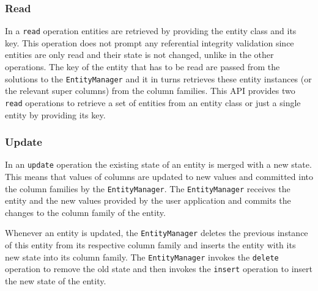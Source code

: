 		
		
		\subsubsection{Read}
		In a \texttt{read} operation  entities are  retrieved by providing the
		entity class and its key. This operation does not prompt any referential integrity
		validation since entities are only read and their state is not changed, 
		 unlike in the other operations. 
		The key of the entity  that has to be read are passed from the
		solutions to the \texttt{EntityManager} and it in turns retrieves these entity
		instances (or the relevant super columns) from the column families.  This
		\ac{API} provides two \texttt{read} operations to retrieve a set of
		entities from an entity class or just a single entity by providing its key.
		
		
		\subsubsection{Update}\label{ss:update}
		In an \texttt{update} operation the existing state of an entity is merged
		with a new state. 
		This means that  values of columns are updated to new values and
		 committed into the column families by the \texttt{EntityManager}.  The
		\texttt{EntityManager} receives the entity and the new values provided by the user
		application and commits the changes to the column family of the entity. 
		
		Whenever an entity is updated, the \texttt{EntityManager} deletes the
		previous instance of this entity from its respective column family and inserts
		the entity with its new state into its column family.
		The \texttt{EntityManager} invokes  the \texttt{delete} operation to remove
		the old state and then invokes the \texttt{insert} operation to insert the new
		state of the entity.
		
